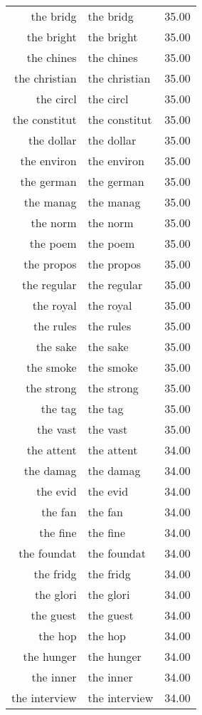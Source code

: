 \begin{table}[ht]
\begin{tabular}{rlr}
  the bridg & the bridg & 35.00 \\ 
  the bright & the bright & 35.00 \\ 
  the chines & the chines & 35.00 \\ 
  the christian & the christian & 35.00 \\ 
  the circl & the circl & 35.00 \\ 
  the constitut & the constitut & 35.00 \\ 
  the dollar & the dollar & 35.00 \\ 
  the environ & the environ & 35.00 \\ 
  the german & the german & 35.00 \\ 
  the manag & the manag & 35.00 \\ 
  the norm & the norm & 35.00 \\ 
  the poem & the poem & 35.00 \\ 
  the propos & the propos & 35.00 \\ 
  the regular & the regular & 35.00 \\ 
  the royal & the royal & 35.00 \\ 
  the rules & the rules & 35.00 \\ 
  the sake & the sake & 35.00 \\ 
  the smoke & the smoke & 35.00 \\ 
  the strong & the strong & 35.00 \\ 
  the tag & the tag & 35.00 \\ 
  the vast & the vast & 35.00 \\ 
  the attent & the attent & 34.00 \\ 
  the damag & the damag & 34.00 \\ 
  the evid & the evid & 34.00 \\ 
  the fan & the fan & 34.00 \\ 
  the fine & the fine & 34.00 \\ 
  the foundat & the foundat & 34.00 \\ 
  the fridg & the fridg & 34.00 \\ 
  the glori & the glori & 34.00 \\ 
  the guest & the guest & 34.00 \\ 
  the hop & the hop & 34.00 \\ 
  the hunger & the hunger & 34.00 \\ 
  the inner & the inner & 34.00 \\ 
  the interview & the interview & 34.00 \\ 

\end{tabular}
\end{table}
